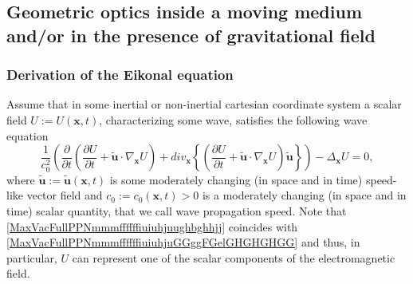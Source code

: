 \documentclass{article}
\theoremstyle{definition}
\theoremstyle{remark}
\renewcommand{\vec}[1]{\mathbf{#1}}
\newcommand{\er}{\eqref}
\newcommand{\er}{\eqref}
\begin{document}
\subsection{Geometric optics inside a moving medium and/or in the presence of gravitational
field}\label{GO}
\subsubsection{Derivation of the Eikonal equation}\label{ekGO}
Assume that in some inertial or non-inertial cartesian coordinate
system a scalar field $U:=U(\vec x,t)$, characterizing some wave,
satisfies the following wave equation
\begin{equation}\label{MaxVacFullPPNmmmffffffiuiuhjuughbghhjj}
\frac{1}{c^2_0}\left(\frac{\partial}{\partial t}\left(\frac{\partial
U}{\partial t}+\vec {\tilde u}\cdot\nabla_{\vec x}U\right)+div_{\vec
x} \left\{\left(\frac{\partial U}{\partial t}+\vec {\tilde
u}\cdot\nabla_{\vec x} U\right)\vec {\tilde
u}\right\}\right)-\Delta_{\vec x}U=0,
\end{equation}
where $\vec {\tilde u}:=\vec {\tilde u}(\vec x,t)$ is some
moderately changing (in space and in time) speed-like vector field
and $c_0:=c_0(\vec x,t)>0$ is a moderately changing (in space and in
time) scalar quantity, that we call wave propagation speed. Note
that \er{MaxVacFullPPNmmmffffffiuiuhjuughbghhjj} coincides with
\er{MaxVacFullPPNmmmffffffiuiuhjuGGggFGelGHGHGHGG} and thus, in
particular, $U$ can represent one of the scalar components of the
electromagnetic field.
\end{document}
